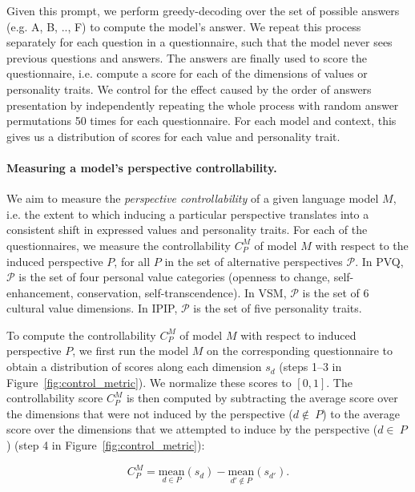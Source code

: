 Given this prompt, we perform greedy-decoding over the set of possible answers (e.g. A, B, .., F) to compute the model's answer. We repeat this process separately for each question in a questionnaire, such that the model never sees previous questions and answers. The answers are finally used to score the questionnaire, i.e. compute a score for each of the dimensions of values or personality traits. We control for the effect caused by the order of answers presentation \citep{lu2021fantastically} by independently repeating the whole process with random answer permutations 50 times for each questionnaire. For each model and context, this gives us a distribution of scores for each value and personality trait.

\paragraph{Measuring a model's perspective controllability.} We aim to measure the \textit{perspective controllability} of a given language model $M$, i.e. the extent to which inducing a particular perspective translates into a consistent shift in expressed values and personality traits. For each of the questionnaires, we measure the controllability $C^M_P$ of model $M$ with respect to the induced perspective $P$, for all $P$ in the set of alternative perspectives $\mathcal{P}$. In PVQ, $\mathcal{P}$ is the set of four personal value categories (openness to change, self-enhancement, conservation, self-transcendence). In VSM,  $\mathcal{P}$ is the set of 6 cultural value dimensions. In IPIP,  $\mathcal{P}$ is the set of five personality traits. 

To compute the controllability $C^M_P$ of model $M$ with respect to induced perspective $P$, we first run the model $M$ on the corresponding questionnaire to obtain a distribution of scores along each dimension $s_d$  (steps 1--3 in Figure~\ref{fig:control_metric}). We normalize these scores to $[0, 1]$. The controllability score $C^M_P$ is then computed by subtracting the average score over the dimensions that were not induced by the perspective ($d\notin~P$) to the average score over the dimensions that we attempted to induce by the perspective ($d\in~P$) (step 4 in Figure~\ref{fig:control_metric}):

\begin{equation}
    C^M_P = \underset{d\in P}{\text{mean}}(s_d) - \underset{d'\notin P}{\text{mean}}(s_{d'}).
\end{equation}

